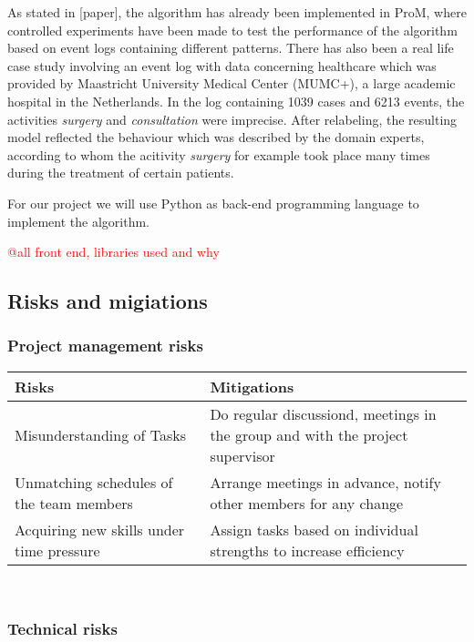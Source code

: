 \documentclass[notitlepage]{article}
\begin{document}
\begin{flushleft}
As stated in [paper], the algorithm has already been implemented in ProM, where controlled experiments have been made to test the performance of the algorithm based on event logs containing different patterns.
There has also been a real life case study involving an event log with data concerning healthcare which was provided by Maastricht University Medical Center (MUMC+), a large academic hospital in the Netherlands.
In the log containing 1039 cases and 6213 events, the activities \textit{surgery} and \textit{consultation} were imprecise.
After relabeling, the resulting model reflected the behaviour which was described by the domain experts, according to whom the acitivity \textit{surgery} for example took place many times during the treatment of certain patients.

For our project we will use Python as back-end programming language to implement the algorithm. 

\textcolor{red}{@all front end, libraries used and why}\\






\subsection{Risks and migiations}

\subsubsection{Project management risks}

\begin{tabularx}{12cm}{|X|X|}
\hline
\textbf{Risks} &\textbf{Mitigations}\\
\hline
Misunderstanding of Tasks & Do regular discussiond, meetings in the group and with the project supervisor\\
\hline
Unmatching schedules of the team members & Arrange meetings in advance, notify other members for any change  \\
\hline
Acquiring new skills under time pressure & Assign tasks based on individual strengths to increase efficiency \\ 
\hline
\end{tabularx}\\ 


\subsubsection{Technical risks}


\end{flushleft}
\end{document}

